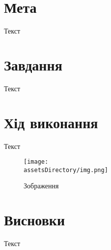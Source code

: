 \section{Мета}
Текст


\section{Завдання}
Текст


\section{Хід виконання}
Текст
\begin{figure}[h!]
    \centering
    \texttt{[image: \\assetsDirectory/img.png]}
    \caption{Зображення}
    \label{fig:img}
\end{figure}




\section{Висновки}
Текст
